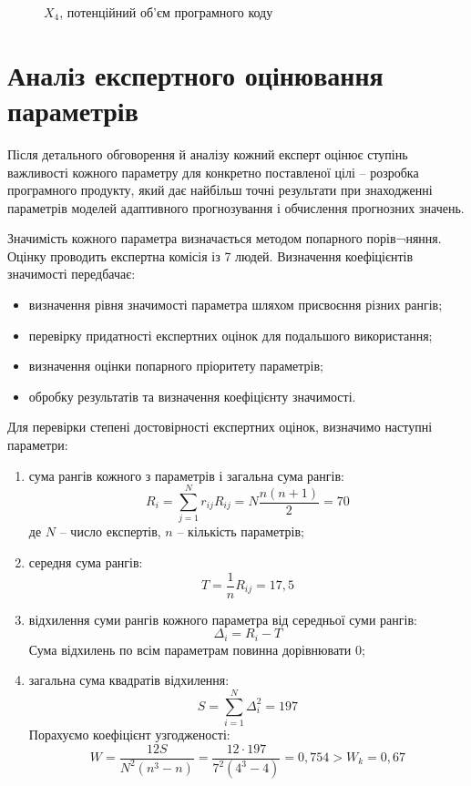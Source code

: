 \documentclass[../diploma]{subfiles}
\begin{document}
\begin{figure}[H]
\centering
{}
\caption{$X_4$, потенційний об'єм програмного коду}\label{fig:X4}
\end{figure}

\section{Аналіз експертного оцінювання параметрів}

Після детального обговорення й аналізу кожний експерт оцінює ступінь важливості кожного параметру для конкретно поставленої цілі -- розробка програмного продукту, який дає найбільш точні результати при знаходженні параметрів моделей адаптивного прогнозування і обчислення прогнозних значень.

Значимість кожного параметра визначається методом попарного порів¬няння. Оцінку проводить експертна комісія із 7 людей. Визначення коефіцієнтів значимості передбачає:
\begin{itemize}
\item визначення рівня значимості параметра шляхом присвоєння різних рангів;
\item перевірку придатності експертних оцінок для подальшого використання;
\item визначення оцінки попарного пріоритету параметрів;
\item обробку результатів та визначення коефіцієнту значимості.
\end{itemize}

Для перевірки степені достовірності експертних оцінок, визначимо наступні параметри:
\begin{enumerate}
\item сума рангів кожного з параметрів і загальна сума рангів:
$$
R_i = \sum_{j=1}^{N}r_{ij}R_{ij} = N\frac{n(n+1)}{2} = 70
$$
де $N$ -- число експертів, $n$ -- кількість параметрів;

\item середня сума рангів:
$$
T = \frac1n R_{ij} = 17,5
$$

\item відхилення суми рангів кожного параметра від середньої суми рангів:
$$
\Delta_i = R_i-T
$$
Сума відхилень по всім параметрам повинна дорівнювати 0;

\item загальна сума квадратів відхилення:
$$
S = \sum_{i=1}^{N}\Delta_i^2 = 197
$$
Порахуємо коефіцієнт узгодженості:
$$
W= \frac{12S}{N^2(n^3-n)} = \frac{12\cdot197}{7^2(4^3-4)} = 0,754 > W_k = 0,67
$$
\end{enumerate}
\end{document}
